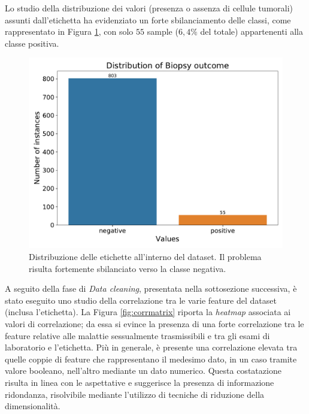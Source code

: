 Lo studio della distribuzione dei valori (presenza o assenza di cellule tumorali) assunti dall'etichetta ha evidenziato un forte sbilanciamento delle classi, come rappresentato in Figura \ref{fig:biopsydistribution}, con solo $55$ sample ($6,4\%$ del totale) appartenenti alla classe positiva.
\begin{figure}
	\centering
	\includegraphics[width=1\linewidth]{images/biopsy_distribution}
	\caption{Distribuzione delle etichette all'interno del dataset. Il problema risulta fortemente sbilanciato verso la classe negativa.}
	\label{fig:biopsydistribution}
\end{figure}
A seguito della fase di \textit{Data cleaning}, presentata nella sottosezione successiva, è stato eseguito uno studio della correlazione tra le varie feature del dataset (inclusa l'etichetta). La Figura \ref{fig:corrmatrix} riporta la \textit{heatmap} associata ai valori di correlazione; da essa si evince la presenza di una forte correlazione tra le feature relative alle malattie sessualmente trasmissibili e tra gli esami di laboratorio e l'etichetta. Più in generale, è presente una correlazione elevata tra quelle coppie di feature che rappresentano il medesimo dato, in un caso tramite valore booleano, nell'altro mediante un dato numerico. Questa costatazione risulta in linea con le aspettative e suggerisce la presenza di informazione ridondanza, risolvibile mediante l'utilizzo di tecniche di riduzione della dimensionalità.
